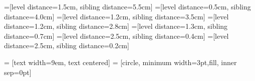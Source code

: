 \documentclass{article}
\begin{document}
\pagestyle{empty}


=[level distance=1.5cm, sibling distance=5.5cm]
=[level distance=0.5cm, sibling distance=4.0cm]
=[level distance=1.2cm, sibling distance=3.5cm]
=[level distance=1.2cm, sibling distance=2.8cm]
=[level distance=1.3cm, sibling distance=0.7cm]
=[level distance=2.5cm, sibling distance=0.4cm]
=[level distance=2.5cm, sibling distance=0.2cm]


 = [text width=9em, text centered]
 = [circle, minimum width=3pt,fill, inner sep=0pt]
\end{document}
